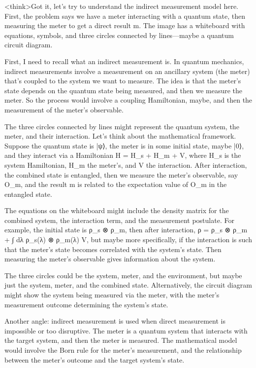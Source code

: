 <think>Got it, let's try to understand the indirect measurement model here. First, the problem says we have a meter interacting with a quantum state, then measuring the meter to get a direct result m. The image has a whiteboard with equations, symbols, and three circles connected by lines—maybe a quantum circuit diagram. 

First, I need to recall what an indirect measurement is. In quantum mechanics, indirect measurements involve a measurement on an ancillary system (the meter) that's coupled to the system we want to measure. The idea is that the meter's state depends on the quantum state being measured, and then we measure the meter. So the process would involve a coupling Hamiltonian, maybe, and then the measurement of the meter's observable.

The three circles connected by lines might represent the quantum system, the meter, and their interaction. Let's think about the mathematical framework. Suppose the quantum state is |ψ⟩, the meter is in some initial state, maybe |0⟩, and they interact via a Hamiltonian H = H_s + H_m + V, where H_s is the system Hamiltonian, H_m the meter's, and V the interaction. After interaction, the combined state is entangled, then we measure the meter's observable, say O_m, and the result m is related to the expectation value of O_m in the entangled state.

The equations on the whiteboard might include the density matrix for the combined system, the interaction term, and the measurement postulate. For example, the initial state is ρ_s ⊗ ρ_m, then after interaction, ρ = ρ_s ⊗ ρ_m + ∫ dλ ρ_s(λ) ⊗ ρ_m(λ) V, but maybe more specifically, if the interaction is such that the meter's state becomes correlated with the system's state. Then measuring the meter's observable gives information about the system.

The three circles could be the system, meter, and the environment, but maybe just the system, meter, and the combined state. Alternatively, the circuit diagram might show the system being measured via the meter, with the meter's measurement outcome determining the system's state. 

Another angle: indirect measurement is used when direct measurement is impossible or too disruptive. The meter is a quantum system that interacts with the target system, and then the meter is measured. The mathematical model would involve the Born rule for the meter's measurement, and the relationship between the meter's outcome and the target system's state. 


